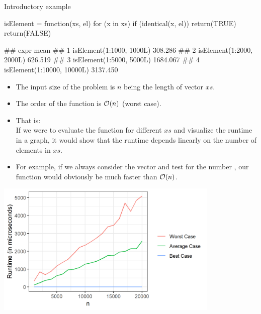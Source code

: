 \begin{vbframe}{Introductory example}
\lz
\footnotesize
\begin{verbbox}
isElement = function(xs, el) {
  for (x in xs) {
    if (identical(x, el))
      return(TRUE)
  }
  return(FALSE)
}
\end{verbbox}
\col
\lz
\begin{verbbox}
## expr mean
## 1 isElement(1:1000, 1000L) 308.286
## 2 isElement(1:2000, 2000L) 626.519
## 3 isElement(1:5000, 5000L) 1684.067
## 4 isElement(1:10000, 10000L) 3137.450
\end{verbbox}
\col
%

\normalsize
\framebreak

\begin{itemize}
  \item The input size of the problem is $n$ being the length of vector $xs$.
  \item The order of the function is $\mathcal{O}(n)$ (worst case).
  \item That is: \\
  If we were to evaluate the function for different $xs$ and visualize the runtime in
  a graph, it would show that the runtime depends linearly on the number of elements in $xs$.
   \item For example, if we always consider the vector  and test for the number , our function would obviously be much faster than $\mathcal{O}(n)$.
\end{itemize}


\framebreak

\begin{center}
\includegraphics[width=0.8\textwidth]{figure_man/runtime.png}
\end{center}


\end{vbframe}
